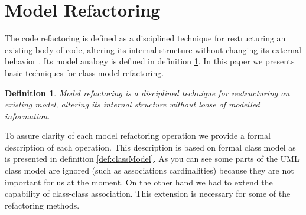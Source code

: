 \documentclass[10pt,a4paper]{article}
\newtheorem{mydef}{Definition}
\begin{document}
\section{Model Refactoring}
The code refactoring is defined as a disciplined technique for restructuring an existing body of code, altering its internal structure without changing its external behavior \cite{Fowler1999}. Its model analogy is defined in definition \ref{def:refactoring}. In this paper we presents basic techniques for class model refactoring. 
\begin{mydef}
\label{def:refactoring}
Model refactoring is a disciplined technique for restructuring an existing model, altering its internal structure without loose of modelled information.
\end{mydef}
To assure clarity of each model refactoring operation we provide a formal description of each operation. This description is based on formal class model as is presented in definition \ref{def:classModel}. As you can see some parts of the UML class model \cite{umlInfra07} are ignored (such as associations cardinalities) because they are not important for us at the moment. On the other hand we had to extend the capability of class-class association. This extension is necessary for some of the refactoring methods.
\end{document}
